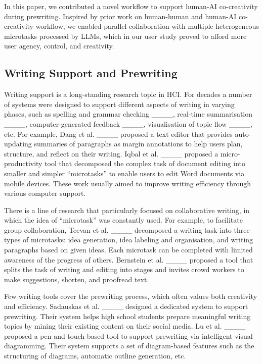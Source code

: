In this paper, we contributed a novel workflow to support human-AI co-creativity during prewriting. Inspired by prior work on human-human and human-AI co-creativity workflow, we enabled parallel collaboration with multiple heterogeneous microtasks processed by LLMs, which in our user study proved to afford more user agency, control, and creativity.

\subsection{Writing Support and Prewriting}
Writing support is a long-standing research topic in HCI. For decades a number of systems were designed to support different aspects of writing in varying phases, such as spelling and grammar checking ____, real-time summarisation ____, computer-generated feedback ____, visualisation of topic flow ____, etc. For example, Dang et al. ____ proposed a text editor that provides auto-updating summaries of paragraphs as margin annotations to help users plan, structure, and reflect on their writing. Iqbal et al. ____ proposed a micro-productivity tool that decomposed the complex task of document editing into smaller and simpler ``microtasks'' to enable users to edit Word documents via mobile devices. These work usually aimed to improve writing efficiency through various computer support.

There is a line of research that particularly focused on collaborative writing, in which the idea of ``microtask'' was constantly used. For example, to facilitate group collaboration, Teevan et al. ____ decomposed a writing task into three types of microtasks: idea generation, idea labeling and organisation, and writing paragraphs based on given ideas. Each microtask can be completed with limited awareness of the progress of others. Bernstein et al. ____ proposed a tool that splits the task of writing and editing into stages and invites crowd workers to make suggestions, shorten, and proofread text.

Few writing tools cover the prewriting process, which often values both creativity and efficiency. Sadauskas et al. ____ designed a dedicated system to support prewriting. Their system helps high school students prepare meaningful writing topics by mining their existing content on their social media. Lu et al. ____ proposed a pen-and-touch-based tool to support prewriting via intelligent visual diagramming. Their system supports a set of diagram-based features such as the structuring of diagrams, automatic outline generation, etc.

